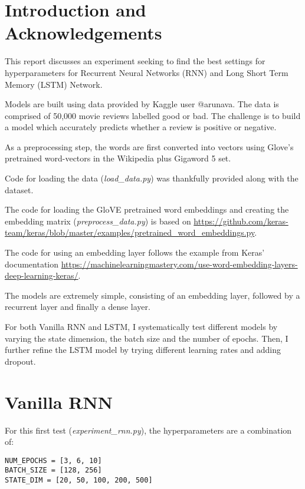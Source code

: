 \documentclass[letterpaper, 10pt]{article}
\begin{document}
\section{Introduction and Acknowledgements}

This report discusses an experiment seeking to find the best
settings for hyperparameters for Recurrent Neural Networks (RNN) and Long Short
Term Memory (LSTM) Network.

Models are built using data\cite{maas-EtAl:2011:ACL-HLT2011} provided by
Kaggle user @arunava. The data is comprised of
50,000 movie reviews labelled good or bad. The challenge is to build
a model which accurately predicts whether a review is positive or negative.

As a preprocessing step, the words are first converted into vectors using
Glove's\cite{pennington2014glove} pretrained word-vectors in the Wikipedia plus
Gigaword 5 set.

Code for loading the data ({\em load\_data.py}) was thankfully provided along with the
dataset.

The code for loading the GloVE pretrained word embeddings and creating the embedding
 matrix ({\em preprocess\_data.py}) is based on \url{https://github.com/keras-team/keras/blob/master/examples/pretrained\_word\_embeddings.py}.

The code for using an embedding layer follows the example from Keras' documentation \url{https://machinelearningmastery.com/use-word-embedding-layers-deep-learning-keras/}.

The models are extremely simple, consisting of an embedding layer, followed by
a recurrent layer and finally a dense layer.

For both Vanilla RNN and LSTM, I systematically test different models by varying the
state dimension, the batch size and the number of epochs. Then, I further refine
the LSTM model by trying different learning rates and adding dropout.

\section{Vanilla RNN}

For this first test ({\em experiment\_rnn.py}), the hyperparameters are a combination
of:

\begin{verbatim}
NUM_EPOCHS = [3, 6, 10]
BATCH_SIZE = [128, 256]
STATE_DIM = [20, 50, 100, 200, 500]
\end{verbatim}
\end{document}
